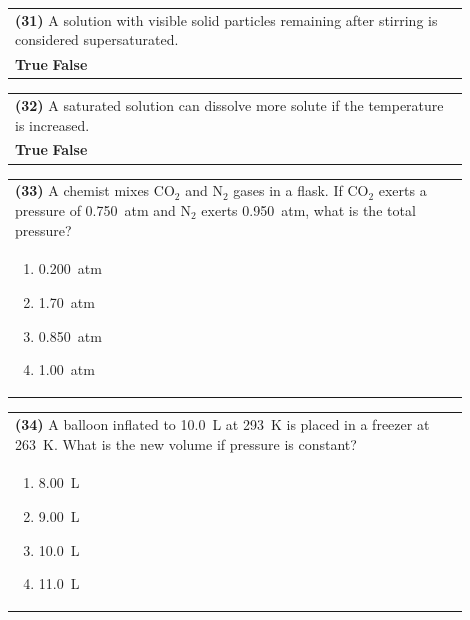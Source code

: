 \documentclass{article}
\begin{document}
{{\vspace{0.2cm}
\noindent\begin{tabular}{|p{0.9\linewidth}|}
\hline
\textbf{(31)} A solution with visible solid particles remaining after stirring is considered supersaturated.\\[0.2cm]
\textbf{True} \hspace{1cm} \textbf{False}\\[0.2cm]
\hline
\end{tabular}

\vspace{0.2cm}
\noindent\begin{tabular}{|p{0.9\linewidth}|}
\hline
\textbf{(32)} A saturated solution can dissolve more solute if the temperature is increased.\\[0.2cm]
\textbf{True} \hspace{1cm} \textbf{False}\\[0.2cm]
\hline
\end{tabular}
\newpage

\vspace{0.2cm}
\noindent\begin{tabular}{|p{0.9\linewidth}|}
\hline
\textbf{(33)} A chemist mixes CO$_2$ and N$_2$ gases in a flask. If CO$_2$ exerts a pressure of 0.750~atm and N$_2$ exerts 0.950~atm, what is the total pressure?\\[0.2cm]
\begin{minipage}[t]{0.85\linewidth}
\begin{enumerate}[label=\alph*.]
\item 0.200~atm
\item 1.70~atm
\item 0.850~atm
\item 1.00~atm
\end{enumerate}
\end{minipage}\\[0.2cm]
\hline
\end{tabular}

\vspace{0.2cm}
\noindent\begin{tabular}{|p{0.9\linewidth}|}
\hline
\textbf{(34)} A balloon inflated to 10.0~L at 293~K is placed in a freezer at 263~K. What is the new volume if pressure is constant?\\[0.2cm]
\begin{minipage}[t]{0.85\linewidth}
\begin{enumerate}[label=\alph*.]
\item 8.00~L
\item 9.00~L
\item 10.0~L
\item 11.0~L
\end{enumerate}
\end{minipage}\\[0.2cm]
\hline
\end{tabular}

}}
\end{document}
